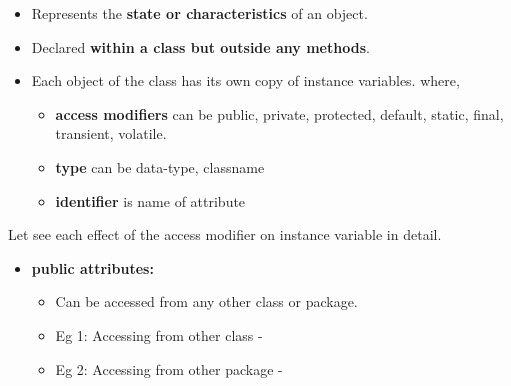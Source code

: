\setlength{\columnsep}{3pt}
\begin{flushleft}

	\begin{itemize}
		\item Represents the \textbf{state or characteristics} of an object.
		\item Declared \textbf{within a class but outside any methods}.
		\item Each object of the class has its own copy of instance variables.
		\bigskip
		where,
		\begin{itemize}
			\item \textbf{access modifiers} can be public, private, protected, default, static, final, transient, volatile.
			\item \textbf{type} can be data-type, classname
			\item \textbf{identifier} is name of attribute
		\end{itemize}
		
	\end{itemize}	
	
	Let see each effect of the access modifier on instance variable in detail.
	\begin{itemize}
		\item \textbf{public attributes:}
		\begin{itemize}
			\item Can be accessed from any other class or package.
			\item Eg 1: Accessing from other class -
			\bigskip

			\newpage
		
			\bigskip
			\item Eg 2: Accessing from other package -
			\bigskip
			

\end{itemize}
\end{itemize}
\end{flushleft}
